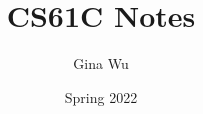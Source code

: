 \documentclass[10pt, article, oneside]{memoir}
\title{\textbf{CS61C Notes}}
\author{Gina Wu}
\date{Spring 2022}
\begin{document}
	\maketitle
	\tableofcontents*
	\newpage

	
	
	
\end{document}
